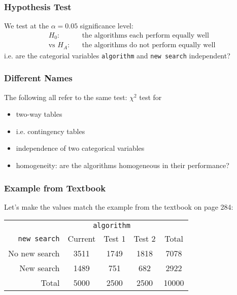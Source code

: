 \documentclass[handout]{beamer}
\newcommand{\blue}[1]{\textcolor{blue2}{#1}}
\begin{document}
\begin{frame}
\frametitle{Hypothesis Test}
We test at the $\alpha=0.05$ significance level:
\begin{eqnarray*}
H_0:&& \mbox{the algorithms each perform equally well}\\
\mbox{vs } H_A:&& \mbox{the algorithms do not perform equally well}
\end{eqnarray*}
i.e. are the categorial variables {\tt algorithm} and {\tt new search} independent? 

\end{frame}


\begin{frame}
\frametitle{Different Names}

The following all refer to the same test:  $\chi^2$ test for 
\begin{itemize}
\item \blue{two-way tables}
\item i.e. \blue{contingency tables}
\item \blue{independence} of two categorical variables
\item \blue{homogeneity}:  are the algorithms homogeneous in their performance?
\end{itemize}

\end{frame}


\begin{frame}
\frametitle{Example from Textbook}

Let's make the values match the example from the textbook on page 284:
\begin{center}
  \begin{tabular}{r|ccc|c}
& \multicolumn{3}{c|}{{\tt algorithm}} & \\
       {\tt new search} & Current & Test 1 & Test 2 & Total \\ 
\hline
    No new search & 3511 & 1749 & 1818 & 7078 \\ 
    New search & 1489 & 751 & 682 & 2922 \\ 
\hline
    Total & 5000 & 2500 & 2500 & 10000 \\ 
  \end{tabular}
\end{center}


\end{frame}
\end{document}
